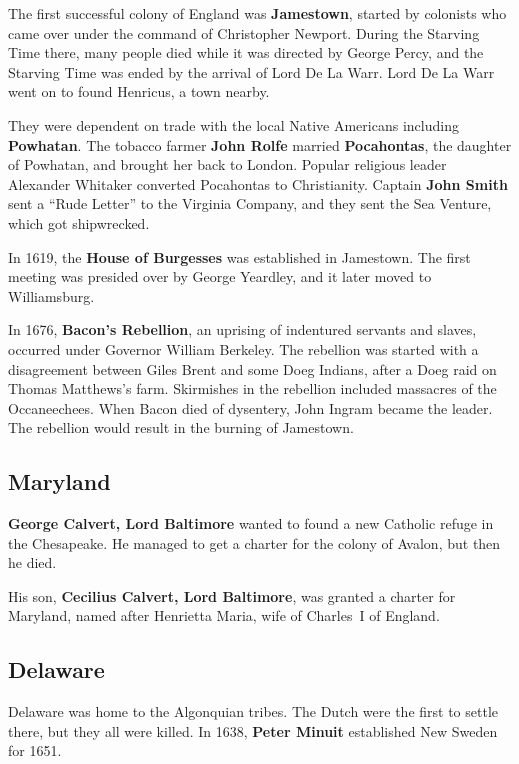 The first successful colony of England was \textbf{Jamestown},
started by colonists who came over under the command of Christopher Newport.
During the Starving Time there, many people died while it was directed by George Percy,
and the Starving Time was ended by the arrival of Lord De La Warr.
Lord De La Warr went on to found Henricus, a town nearby.

They were dependent on trade with the local Native Americans including \textbf{Powhatan}.
The tobacco farmer \textbf{John Rolfe} married \textbf{Pocahontas},
the daughter of Powhatan, and brought her back to London.
Popular religious leader Alexander Whitaker converted Pocahontas to Christianity.
Captain \textbf{John Smith} sent a ``Rude Letter'' to the Virginia Company,
and they sent the Sea Venture, which got shipwrecked.

In 1619, the \textbf{House of Burgesses} was established in Jamestown.
The first meeting was presided over by George Yeardley,
and it later moved to Williamsburg.

In 1676, \textbf{Bacon's Rebellion}, an uprising of indentured servants and slaves,
occurred under Governor William Berkeley.
The rebellion was started with a disagreement between Giles Brent and some Doeg Indians,
after a Doeg raid on Thomas Matthews's farm.
Skirmishes in the rebellion included massacres of the Occaneechees.
When Bacon died of dysentery, John Ingram became the leader.
The rebellion would result in the burning of Jamestown.

\subsection*{Maryland}

\textbf{George Calvert, Lord Baltimore} wanted to found a new Catholic refuge in the Chesapeake.
He managed to get a charter for the colony of Avalon, but then he died.

His son, \textbf{Cecilius Calvert, Lord Baltimore}, was granted a charter for Maryland,
named after Henrietta Maria, wife of Charles~I of England.

\subsection*{Delaware}

Delaware was home to the Algonquian tribes.
The Dutch were the first to settle there, but they all were killed.
In 1638, \textbf{Peter Minuit} established New Sweden for 1651.

